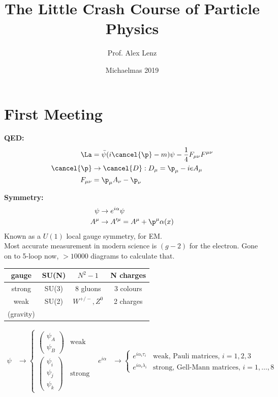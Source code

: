 \documentclass[a4paper, 11pt, normalem]{article}
\title{The Little Crash Course of Particle Physics \vspace{-20pt}}
\author{Prof. Alex Lenz}
\date{\vspace{-15pt}Michaelmas 2019}
\begin{document}
\maketitle

\section*{First Meeting}
\textbf{\large QED:}
\begin{align}
    \La &= \bar{\psi}(i\cancel{\p}-m)\psi - \frac14F_{\mu\nu}F^{\mu\nu} \\
    \cancel{\p} &\to \cancel{D}: D_\mu = \p_\mu - ieA_\mu \\
    F_{\mu\nu} &= \p_\mu A_\nu - \p_\nu
\end{align}

\textbf{\large Symmetry:}
\begin{align}
    \psi &\to e^{i\alpha}\psi \\
    A^\mu &\to A'^\mu = A^\mu + \p^\mu\alpha(x)
\end{align}
Known as a $U(1)$ local gauge symmetry, for EM. \\
Most accurate measurement in modern science is $(g-2)$ for the electron. 
Gone on to 5-loop now, $>10000$ diagrams to calculate that. 
\begin{table}[H]
    \centering
    \begin{tabular}{c|c|c|c}
        gauge & SU(N) & $N^2-1$ & N charges \\
        \hline
        strong & SU(3) & 8 gluons & 3 colours \\
        weak & SU(2) & $W^{+/-},Z^0$ & 2 charges \\
        (gravity) & & &
    \end{tabular}
\end{table}
\begin{align}
    \psi &\to \begin{cases} \begin{pmatrix} \psi_A \\ \psi_B \end{pmatrix} & \text{weak} \\ \begin{pmatrix} \psi_i \\ \psi_j \\ \psi_k \end{pmatrix} & \text{strong} \end{cases} & e^{i\alpha} &\to \begin{cases} e^{i\alpha_i\tau_i} & \text{weak, Pauli matrices, }i=1,2,3 \\ e^{i\alpha_i\lambda_i} & \text{strong, Gell-Mann matrices, }i=1,\dots,8 \end{cases}
\end{align}
\end{document}
